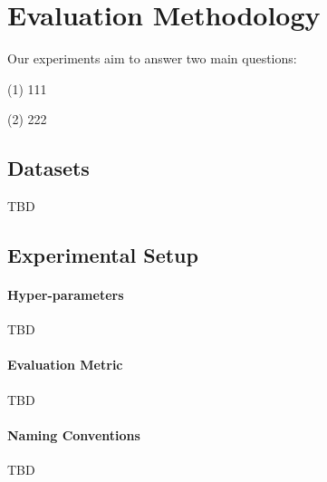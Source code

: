 \section{Evaluation Methodology}
Our experiments aim to answer two main questions:

(1) 111

(2) 222



\subsection{Datasets}
TBD


\subsection{Experimental Setup}
\paragraph{Hyper-parameters}
TBD
\paragraph{Evaluation Metric}
TBD
\paragraph{Naming Conventions}
TBD




